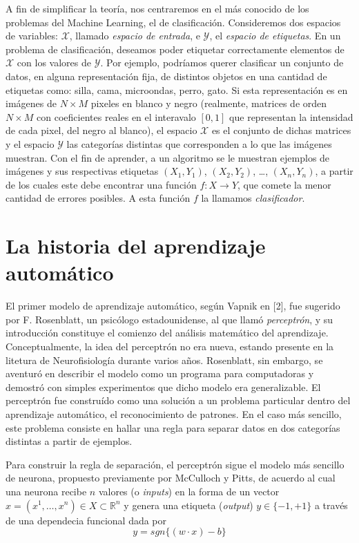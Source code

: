 \documentclass{report}
\begin{document}
A fin de simplificar la teoría, nos centraremos  en el más conocido de los problemas del Machine Learning, el de clasificación. Consideremos dos espacios
de variables: \(\mathcal{X}\), llamado \textit{espacio de entrada}, e \(\mathcal{Y}\), el  \textit{espacio de etiquetas}. En un problema de clasificación, deseamos poder etiquetar 
correctamente elementos de \(\mathcal{X}\) con los valores de \(\mathcal{Y}\). Por ejemplo, podríamos querer clasificar un conjunto de datos, en alguna representación fija, de distintos 
objetos en una cantidad de etiquetas como: silla, cama, microondas, perro, gato. Si esta representación es en imágenes de \(N\times M\) pixeles en blanco y negro (realmente, 
matrices de orden \(N\times M\) con coeficientes reales en el interavalo \([0,1]\) que representan la intensidad de cada pixel, del negro al blanco), el espacio \(\mathcal{X}\) es 
el conjunto de dichas matrices y el espacio \(\mathcal{Y}\) las categorías distintas que corresponden a lo que las imágenes muestran. Con el fin de aprender, a un algoritmo se le 
muestran ejemplos de imágenes y sus respectivas etiquetas \((X_1,Y_1)\), \((X_2,Y_2)\), \dots, \((X_n,Y_n)\), a partir de los cuales este debe encontrar una función
\(f: X\rightarrow Y\), que comete la menor cantidad de errores posibles. A esta función \(f\) la llamamos \textit{clasificador}.\newline

\section{La historia del aprendizaje automático}

El primer modelo de aprendizaje automático, según Vapnik en [2], fue sugerido por F. Rosenblatt, un psicólogo estadounidense, al que llamó \textit{perceptrón}, y su introducción
constituye el comienzo del análisis matemático del aprendizaje. Conceptualmente, la idea del perceptrón no era nueva, estando presente en la litetura de Neurofisiología durante
varios años. Rosenblatt, sin embargo, se aventuró en describir el modelo como un programa para computadoras y demostró con simples experimentos que dicho modelo era generalizable.
El perceptrón fue construído como una solución a un problema particular dentro del aprendizaje automático, el reconocimiento de patrones. En el caso más sencillo, este problema
consiste en hallar una regla para separar datos en dos categorías distintas a partir de ejemplos.\newline

Para construir la regla de separación, el perceptrón sigue el modelo más sencillo de neurona, propuesto previamente por McCulloch y Pitts, de acuerdo al cual una neurona recibe
\(n\) valores (o \textit{inputs}) en la forma de un vector \(x = (x^1,\dots, x^n) \in X \subset \mathbb{R}^n \) y genera una etiqueta (\textit{output}) 
\(y\in\{-1,+1\}\) a través de una dependecia funcional dada por
\[
y = sgn\{(w\cdot x)-b\}
\]
\end{document}
